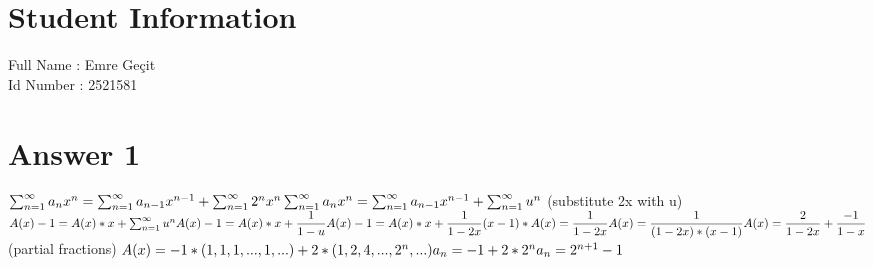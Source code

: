 \documentclass[12pt]{article}
\begin{document}
\section*{Student Information } 
Full Name : Emre Geçit \\
Id Number : 2521581\\

\section*{Answer 1}
$\sum_{n=1}^{\infty} a_nx^{n} = \sum_{n=1}^{\infty} a_{n-1}x^{n-1} + \sum_{n=1}^{\infty}2^nx^{n}\\\\
\sum_{n=1}^{\infty} a_nx^{n} = \sum_{n=1}^{\infty} a_{n-1}x^{n-1} + \sum_{n=1}^{\infty}u^{n}$ (substitute 2x with u)$\\\\
A(x)-1=A(x)*x+\sum_{n=1}^{\infty}u^{n}\\\\
A(x)-1=A(x)*x+\dfrac{1}{1-u}\\\\
A(x)-1=A(x)*x+\dfrac{1}{1-2x}\\\\
(x-1)*A(x)=\dfrac{1}{1-2x}\\\\
A(x)=\dfrac{1}{(1-2x)*(x-1)}\\\\
A(x)=\dfrac{2}{1-2x}+\dfrac{-1}{1-x}$ (partial fractions)
$\\\\A(x)=-1*(1,1,1,...,1,...)+2*(1,2,4,...,2^n,...)\\\\
a_n=-1+2*2^n\\\\
a_n=2^{n+1}-1\\\\$
\end{document}

